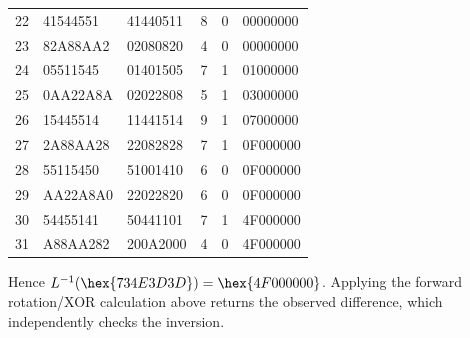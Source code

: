 \begin{longtable}{rllrrl}
22 & 41544551 & 41440511 & 8 & 0 & 00000000\\
23 & 82A88AA2 & 02080820 & 4 & 0 & 00000000\\
24 & 05511545 & 01401505 & 7 & 1 & 01000000\\
25 & 0AA22A8A & 02022808 & 5 & 1 & 03000000\\
26 & 15445514 & 11441514 & 9 & 1 & 07000000\\
27 & 2A88AA28 & 22082828 & 7 & 1 & 0F000000\\
28 & 55115450 & 51001410 & 6 & 0 & 0F000000\\
29 & AA22A8A0 & 22022820 & 6 & 0 & 0F000000\\
30 & 54455141 & 50441101 & 7 & 1 & 4F000000\\
31 & A88AA282 & 200A2000 & 4 & 0 & 4F000000\\
\bottomrule\end{longtable}
\endgroup
Hence $L^{-1}(\hex{734E3D3D})=\hex{4F000000}$. Applying the forward rotation/XOR calculation above returns the observed difference, which independently checks the inversion.
